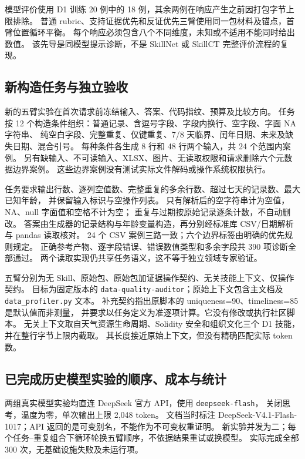 模型评价使用 D1 训练 20 例中的 18 例，其余两例在响应产生之前因打包字节上限排除。
普通 rubric、支持证据优先和反证优先三臂使用同一包材料及锚点，首臂位置循环平衡。
每个响应必须包含八个不同维度，未知或不适用不能同时给出数值。
该先导是同模型提示诊断，不是 SkillNet 或 SkillCT 完整评价流程的复现。

\subsection{新构造任务与独立验收}
新的五臂实验在首次请求前冻结输入、答案、代码指纹、预算及比较方向。
任务按 12 个构造条件组织：普通记录、含逗号字段、字段内换行、空字段、字面 NA 字符串、
纯空白字段、完整重复、仅键重复、7/8 天临界、闰年日期、未来及缺失日期、混合引号。
每种条件各生成 8 行和 48 行两个输入，共 24 个范围内案例。
另有缺输入、不可读输入、XLSX、图片、无读取权限和请求删除六个元数据边界案例。
这些边界案例没有测试实际文件解码或操作系统权限执行。

任务要求输出行数、逐列空值数、完整重复的多余行数、超过七天的记录数、最大已知年龄，
并保留输入标识与空操作列表。
只有解析后的空字符串计为空值，NA、null 字面值和空格不计为空；
重复与过期按原始记录逐条计数，不自动删改。
答案由生成器的记录结构与年龄变量构造，再分别经标准库 CSV/日期解析与 pandas 读取核对。
24 个 CSV 案例三路一致；六个边界标签由明确的优先规则规定。
正确参考产物、逐字段错误、错误数值类型和多余字段共 390 项诊断全部通过。
两个读取实现仍共享任务语义，这不等于独立领域专家验证。

五臂分别为无 Skill、原始包、原始包加证据操作契约、无关技能上下文、仅操作契约。
目标为固定版本的 \texttt{data-quality-auditor}；原始上下文包含主文档及
\texttt{data\_profiler.py} 文本。
补充契约指出原脚本的 uniqueness=90、timeliness=85 是默认值而非测量，
并要求以任务定义为准逐项计算。它没有修改或执行社区脚本。
无关上下文取自天气资源生命周期、Solidity 安全和组织文化三个 D1 技能，并在整行字节上限内截取。
其长度接近原始上下文，但没有精确匹配实际 token 数。

\subsection{已完成历史模型实验的顺序、成本与统计}
两组真实模型实验均直连 DeepSeek 官方 API，使用 \texttt{deepseek-flash}，
关闭思考，温度为零，单次输出上限 2,048 token。
文档当时标注 DeepSeek-V4.1-Flash-1017；API 返回的是可变别名，不能作为不可变权重证明。
新实验并发为二；每个任务--重复组合下循环轮换五臂顺序，不依据结果重试或换模型。
实际完成全部 300 次，无基础设施失败及未运行项。

